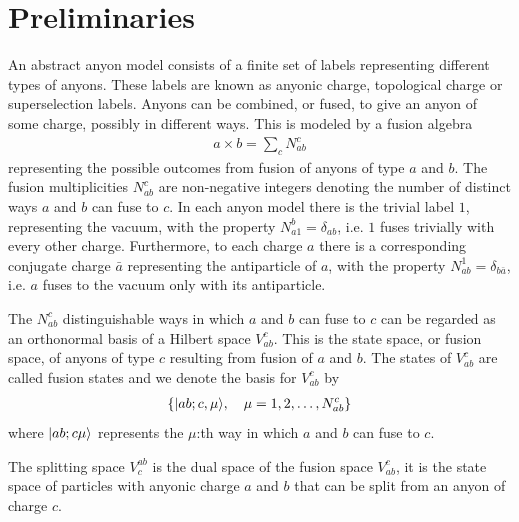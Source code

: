 \documentclass[a4paper,10pt,oneside]{book}
\theoremstyle{plain}
\theoremstyle{definition}
\theoremstyle{remark}
\DeclarePairedDelimiter\ket{\lvert}{\rangle}
\begin{document}
{\section{Preliminaries}

An abstract anyon model consists of a finite set of labels representing different types of anyons. These labels are known as anyonic charge, topological charge or superselection labels. Anyons can be combined, or fused, to give an anyon of some charge, possibly in different ways. This is modeled by a fusion algebra
\begin{align*}
  a \times b = \sum_c N_{ab}^c
\end{align*}
representing the possible outcomes from fusion of anyons of type $a$ and $b$. The fusion multiplicities $N_{ab}^c$ are non-negative integers denoting the number of distinct ways $a$ and $b$ can fuse to $c$. In each anyon model there is the trivial label $1$, representing the vacuum, with the property $N_{a1}^b = \delta_{ab}$, i.e. $1$ fuses trivially with every other charge. Furthermore, to each charge $a$ there is a corresponding conjugate charge $\bar{a}$ representing the antiparticle of $a$, with the property $N_{ab}^1 = \delta_{b\bar{a}}$, i.e. $a$ fuses to the vacuum only with its antiparticle.



The $N_{ab}^c$ distinguishable ways in which $a$ and $b$ can fuse to $c$ can be regarded as an orthonormal basis of a Hilbert space $V_{ab}^c$. This is the state space, or fusion space, of anyons of type $c$ resulting from fusion of $a$ and $b$. The states of $V_{ab}^c$ are called fusion states and we denote the basis for $V_{ab}^c$ by
\begin{align*}
  \{ \ket{ab;c,\mu}, \quad \mu = 1,2,\ldots,N_{ab}^c \}
\end{align*}
where $\ket{ab;c\mu}$ represents the $\mu$:th way in which $a$ and $b$ can fuse to $c$.

The splitting space $V_c^{ab}$ is the dual space of the fusion space $V_{ab}^c$, it is the state space of particles with anyonic charge $a$ and $b$ that can be split from an anyon of charge $c$.

}
\end{document}
